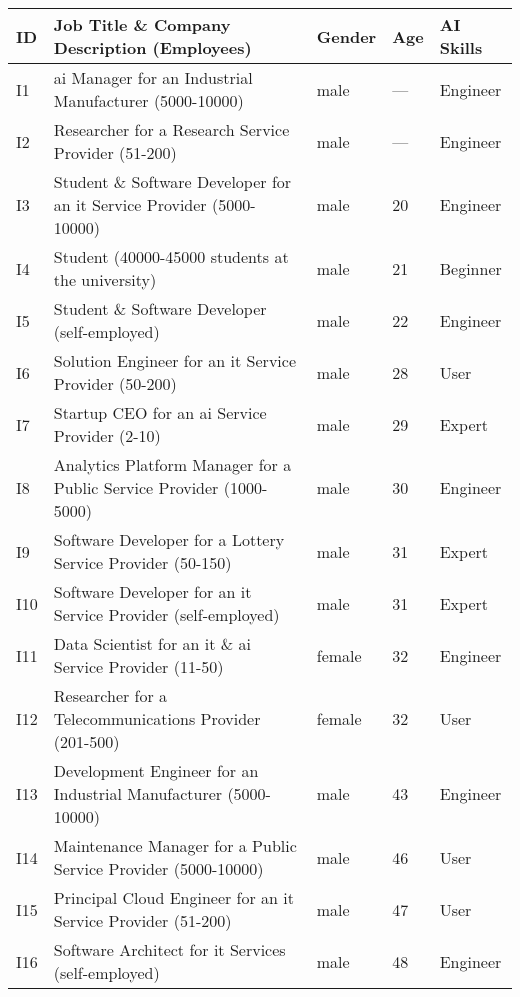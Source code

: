\begin{tabular}{lllll}
    ID & Job Title \& Company Description (Employees) & Gender & Age & AI Skills \\
    \toprule
    I1 & \gls{ai} Manager for an Industrial Manufacturer (5000-10000) & male & --- & Engineer \\
    I2 & Researcher for a Research Service Provider (51-200) & male & --- & Engineer \\
    I3 & Student \& Software Developer for an \gls{it} Service Provider (5000-10000) & male & 20 & Engineer \\
    I4 & Student (40000-45000 students at the university) & male & 21 & Beginner \\
    I5 & Student \& Software Developer (self-employed) & male & 22 & Engineer \\
    I6 & Solution Engineer for an \gls{it} Service Provider (50-200) & male & 28 & User \\
    I7 & Startup CEO for an \gls{ai} Service Provider (2-10) & male & 29 & Expert \\
    I8 & Analytics Platform Manager for a Public Service Provider (1000-5000) & male & 30 & Engineer \\
    I9 & Software Developer for a Lottery Service Provider (50-150) & male & 31 & Expert \\
    I10 & Software Developer for an \gls{it} Service Provider (self-employed) & male & 31 & Expert \\
    I11 & Data Scientist for an \gls{it} \& \gls{ai} Service Provider (11-50) & female & 32 & Engineer \\
    I12 & Researcher for a Telecommunications Provider (201-500) & female & 32 & User \\
    I13 & Development Engineer for an Industrial Manufacturer (5000-10000) & male & 43 & Engineer \\
    I14 & Maintenance Manager for a Public Service Provider (5000-10000) & male & 46 & User \\
    I15 & Principal Cloud Engineer for an \gls{it} Service Provider (51-200) & male & 47 & User \\
    I16 & Software Architect for \gls{it} Services (self-employed) & male & 48 & Engineer \\
\end{tabular}